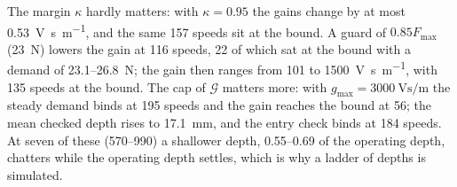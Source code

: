 The margin $\kappa$ hardly matters: with $\kappa=0.95$ the gains change by at most \SI{0.53}{\volt\second\per\metre}, and the same 157 speeds sit at the bound. A guard of $0.85F_{\max}$ (\SI{23}{\newton}) lowers the gain at 116 speeds, 22 of which sat at the bound with a demand of 23.1--\SI{26.8}{\newton}; the gain then ranges from 101 to \SI{1500}{\volt\second\per\metre}, with 135 speeds at the bound. The cap of $\mathcal G$ matters more: with $g_{\max}=\SI{3000}{\volt\second\per\metre}$ the steady demand binds at 195 speeds and the gain reaches the bound at 56; the mean checked depth rises to \SI{17.1}{\milli\metre}, and the entry check binds at 184 speeds. At seven of these (570--\SI{990}{\rpm}) a shallower depth, 0.55--0.69 of the operating depth, chatters while the operating depth settles, which is why a ladder of depths is simulated.
